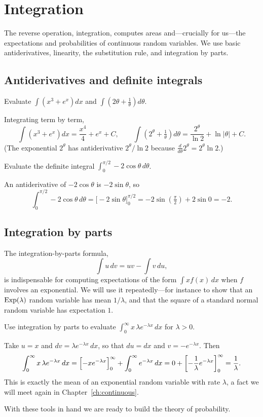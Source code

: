 \section{Integration}

The reverse operation, integration, computes areas and—crucially for us—the
expectations and probabilities of continuous random variables. We use basic
antiderivatives, linearity, the substitution rule, and integration by parts.

\subsection{Antiderivatives and definite integrals}

\begin{example}
Evaluate $\displaystyle\int\!\left(x^3 + e^x\right)dx$ and
$\displaystyle\int\!\left(2\theta + \tfrac{1}{\theta}\right)d\theta$.

\solution Integrating term by term,
\[
  \int\!\left(x^3 + e^x\right)dx = \frac{x^4}{4} + e^x + C,
  \qquad
  \int\!\left(2^\theta + \tfrac{1}{\theta}\right)d\theta
     = \frac{2^\theta}{\ln 2} + \ln|\theta| + C.
\]
(The exponential $2^\theta$ has antiderivative $2^\theta/\ln 2$ because
$\frac{d}{d\theta}2^\theta = 2^\theta\ln 2$.)
\end{example}

\begin{example}
Evaluate the definite integral $\displaystyle\int_0^{\pi/2} -2\cos\theta\,d\theta$.

\solution An antiderivative of $-2\cos\theta$ is $-2\sin\theta$, so
\[
  \int_0^{\pi/2} -2\cos\theta\,d\theta
     = \bigl[-2\sin\theta\bigr]_0^{\pi/2}
     = -2\sin(\tfrac{\pi}{2}) + 2\sin 0 = -2.
\]
\end{example}

\subsection{Integration by parts}

The integration-by-parts formula,
\[
  \int u\,dv = uv - \int v\,du,
\]
is indispensable for computing expectations of the form $\int x f(x)\,dx$ when
$f$ involves an exponential. We will use it repeatedly—for instance to show
that an $\mathrm{Exp}(\lambda)$ random variable has mean $1/\lambda$, and that the
square of a standard normal random variable has expectation $1$.

\begin{example}
Use integration by parts to evaluate
$\displaystyle\int_0^\infty x\,\lambda e^{-\lambda x}\,dx$ for $\lambda > 0$.

\solution Take $u = x$ and $dv = \lambda e^{-\lambda x}\,dx$, so that
$du = dx$ and $v = -e^{-\lambda x}$. Then
\[
  \int_0^\infty x\,\lambda e^{-\lambda x}\,dx
    = \Bigl[-xe^{-\lambda x}\Bigr]_0^\infty + \int_0^\infty e^{-\lambda x}\,dx
    = 0 + \left[-\frac{1}{\lambda}e^{-\lambda x}\right]_0^\infty
    = \frac{1}{\lambda}.
\]
This is exactly the mean of an exponential random variable with rate
$\lambda$, a fact we will meet again in Chapter~\ref{ch:continuous}.
\end{example}

With these tools in hand we are ready to build the theory of probability.
